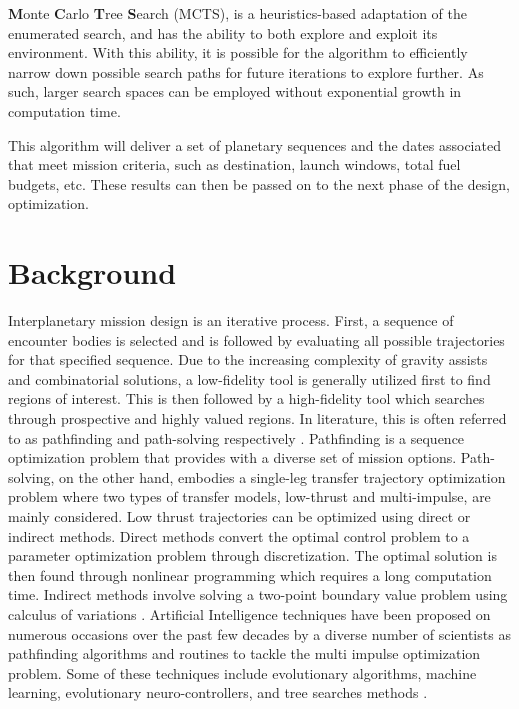 \documentclass[letterpaper, preprint, paper,11pt]{AAS}	%
\begin{document}
\textbf{M}onte \textbf{C}arlo \textbf{T}ree \textbf{S}earch (MCTS), is a heuristics-based adaptation of the enumerated search, and has the ability to both explore and exploit its environment. With this ability, it is possible for the algorithm to efficiently narrow down possible search paths for future iterations to explore further. As such, larger search spaces can be employed without exponential growth in computation time.

This algorithm will deliver a set of planetary sequences and the dates associated that meet mission criteria, such as destination, launch windows, total fuel budgets, etc. These results can then be passed on to the next phase of the design, optimization.


\section{Background}

Interplanetary mission design is an iterative process. First, a sequence of encounter bodies is selected and is followed by evaluating all possible trajectories for that specified sequence. Due to the increasing complexity of gravity assists and combinatorial solutions, a low-fidelity tool is generally utilized first to find regions of interest. This is then followed by a high-fidelity tool which searches through prospective and highly valued regions.  In literature, this is often referred to as pathfinding and path-solving respectively \cite{Hughes2016}. Pathfinding is a sequence optimization problem that provides with a diverse set of mission options. Path-solving, on the other hand, embodies a single-leg transfer trajectory optimization problem where two types of transfer models, low-thrust and multi-impulse, are mainly considered\cite{Li2019}. Low thrust trajectories can be optimized using direct or indirect methods. Direct methods convert the optimal control problem to a parameter optimization problem through discretization. The optimal solution is then found through nonlinear programming which requires a long computation time. Indirect methods involve solving a two-point boundary value problem using calculus of variations \cite{Jiang2012}. Artificial Intelligence techniques have been proposed on numerous occasions over the past few decades by a diverse number of scientists as pathfinding algorithms and routines to tackle the multi impulse optimization problem. Some of these techniques include evolutionary algorithms, machine learning, evolutionary neuro-controllers, and tree searches methods \cite{Izzo2019}.
\end{document}
